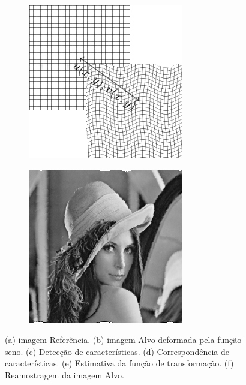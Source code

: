 \begin{figure}[h]
\begin{subfigure}[t]{0.3\textwidth}
      \includegraphics[width=\textwidth]{figuras/estimativa.png}
      \label{fig:estimativa}
    \end{subfigure} 
    \begin{subfigure}[t]{0.3\textwidth}
      \includegraphics[width=\textwidth]{figuras/lenaRegistrada.png}
      \label{fig:lenaRegistrada}
    \end{subfigure}
    \caption{(a) imagem Referência. (b) imagem Alvo deformada pela função seno. 
             (c) Detecção de características. (d) Correspondência de características.
             (e) Estimativa da função de transformação. (f) Reamostragem da imagem Alvo.}
    \label{fig:regExplicacao}
\end{figure}

